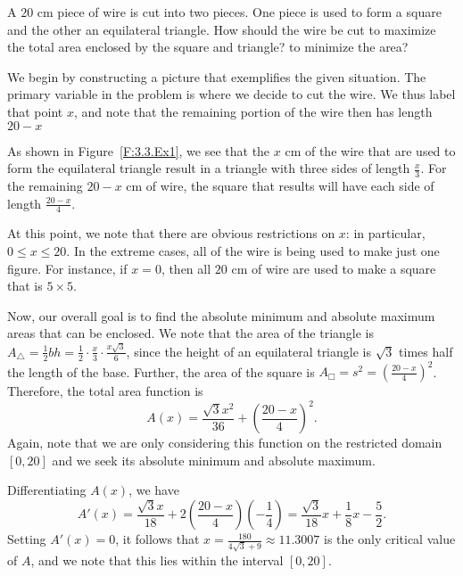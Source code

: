 \begin{example} \label{Ex:3.3.Eg1}
A $20$ cm piece of wire is cut into two pieces.  One piece is used to form a square and the other an equilateral triangle.  How should the wire be cut to maximize the total area enclosed by the square and triangle?  to minimize the area?

\solution
We begin by constructing a picture that exemplifies the given situation.  The primary variable in the problem is where we decide to cut the wire.  We thus label that point $x$, and note that the remaining portion of the wire then has length $20-x$

As shown in Figure~\ref{F:3.3.Ex1}, we see that the $x$ cm of the wire that are used to form the equilateral triangle result in a triangle with three sides of length $\frac{x}{3}$.  For the remaining $20-x$ cm of wire, the square that results will have each side of length $\frac{20-x}{4}$.

At this point, we note that there are obvious restrictions on $x$:  in particular, $0 \le x \le 20$.  In the extreme cases, all of the wire is being used to make just one figure.  For instance, if $x = 0$, then all $20$ cm of wire are used to make a square that is $5 \times 5$.

Now, our overall goal is to find the absolute minimum and absolute maximum areas that can be enclosed.  We note that the area of the triangle is $A_{\triangle} = \frac{1}{2} bh = \frac{1}{2} \cdot \frac{x}{3} \cdot \frac{x\sqrt{3}}{6}$, since the height of an equilateral triangle is $\sqrt{3}$ times half the length of the base.  Further, the area of the square is $A_{\Box} = s^2 = \left( \frac{20-x}{4} \right)^2$.  Therefore, the total area function is
$$A(x) = \frac{\sqrt{3}x^2}{36} + \left( \frac{20-x}{4} \right)^2.$$
Again, note that we are only considering this function on the restricted domain $[0,20]$ and we seek its absolute minimum and absolute maximum.

Differentiating $A(x)$, we have
$$A'(x) = \frac{\sqrt{3}x}{18} + 2\left( \frac{20-x}{4} \right)\left( -\frac{1}{4} \right) = \frac{\sqrt{3}}{18} x + \frac{1}{8}x - \frac{5}{2}.$$
Setting $A'(x) = 0$, it follows that $x = \frac{180}{4\sqrt{3}+9} \approx 11.3007$ is the only critical value of $A$, and we note that this lies within the interval $[0,20]$.  


\end{example}

